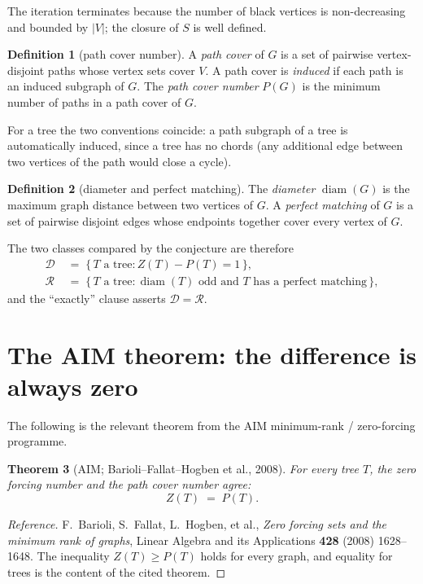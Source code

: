 \documentclass[11pt]{article}
\newtheorem{theorem}{Theorem}
\theoremstyle{definition}
\newtheorem{definition}[theorem]{Definition}
\theoremstyle{remark}
\newcommand{\diam}{\operatorname{diam}}
\begin{document}
The iteration terminates because the number of black vertices is non-decreasing
and bounded by $|V|$; the closure of $S$ is well defined.

\begin{definition}[path cover number]
A \emph{path cover} of $G$ is a set of pairwise vertex-disjoint paths whose
vertex sets cover $V$. A path cover is \emph{induced} if each path is an induced
subgraph of $G$. The \emph{path cover number} $P(G)$ is the minimum number of
paths in a path cover of $G$.

For a tree the two conventions coincide: a path subgraph of a tree is
automatically induced, since a tree has no chords (any additional edge between
two vertices of the path would close a cycle).
\end{definition}

\begin{definition}[diameter and perfect matching]
The \emph{diameter} $\diam(G)$ is the maximum graph distance between two
vertices of $G$. A \emph{perfect matching} of $G$ is a set of pairwise disjoint
edges whose endpoints together cover every vertex of $G$.
\end{definition}

The two classes compared by the conjecture are therefore
\[
\begin{aligned}
\mathcal{D}\; &=\;\{\,T \text{ a tree} : Z(T)-P(T)=1\,\}, \\
\mathcal{R}\; &=\;\{\,T \text{ a tree} : \diam(T)\text{ odd and } T \text{ has a perfect matching}\,\},
\end{aligned}
\]
and the ``exactly'' clause asserts $\mathcal{D}=\mathcal{R}$.

\section{The AIM theorem: the difference is always zero}

The following is the relevant theorem from the AIM minimum-rank / zero-forcing
programme.

\begin{theorem}[AIM; Barioli--Fallat--Hogben et al., 2008]
\label{thm:aim}
For every tree $T$, the zero forcing number and the path cover number agree:
\[
Z(T) \;=\; P(T).
\]
\end{theorem}

\begin{proof}[Reference]
F.~Barioli, S.~Fallat, L.~Hogben, et al., \emph{Zero forcing sets and the
minimum rank of graphs}, Linear Algebra and its Applications \textbf{428}
(2008) 1628--1648. The inequality $Z(T)\ge P(T)$ holds for every graph, and
equality for trees is the content of the cited theorem.
\end{proof}
\end{document}
